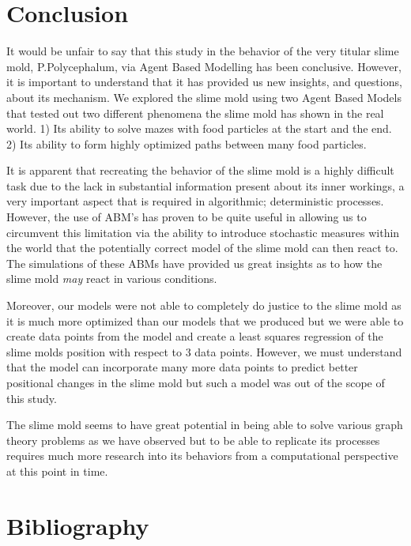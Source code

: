 \documentclass[a4paper, 12pt]{article}
\begin{document}
\section{Conclusion}
It would be unfair to say that this study in the behavior of the very titular slime mold, P.Polycephalum, via Agent Based Modelling has been conclusive. However, it is important to understand that it has provided us new insights, and questions, about its mechanism. We explored the slime mold using two Agent Based Models that tested out two different phenomena the slime mold has shown in the real world. 1) Its ability to solve mazes with food particles at the start and the end. 2) Its ability to form highly optimized paths between many food particles. \par 
It is apparent that recreating the behavior of the slime mold is a highly difficult task due to the lack in substantial information present about its inner workings, a very important aspect that is required in algorithmic; deterministic processes. However, the use of ABM's has proven to be quite useful in allowing us to circumvent this limitation via the ability to introduce stochastic measures within the world that the potentially correct model of the slime mold can then react to. The simulations of these ABMs have provided us great insights as to how the slime mold \textit{may} react in various conditions.
\par 
Moreover, our models were not able to completely do justice to the slime mold as it is much more optimized than our models that we produced but we were able to create data points from the model and create a least squares regression of the slime molds position with respect to 3 data points. However, we must understand that the model can incorporate many more data points to predict better positional changes in the slime mold but such a model was out of the scope of this study.
\par 
The slime mold seems to have great potential in being able to solve various graph theory problems as we have observed but to be able to replicate its processes requires much more research into its behaviors from a computational perspective at this point in time.
\newpage
\section{Bibliography}
\end{document}
